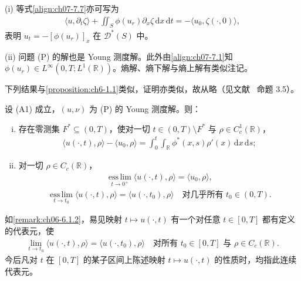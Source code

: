 \documentclass[../../main.tex]{subfiles}%
\begin{document}
\begin{remark}\label{remark:ch07-7.1.3}
(i) 等式\eqref{align:ch07-7.7}亦可写为
\begin{align*}
\langle u,\partial_t\zeta\rangle+\iint_S\phi(u_r)\partial_x\zeta\,\mathrm{d}x\,\mathrm{d}t=-\langle u_0,\zeta(\cdot,0)\rangle,
\end{align*}
表明 $u_t=-[\phi(u_r)]_x$ 在 $\mathcal{D}^*(S)$ 中。

(ii) 问题 (P) 的解也是 Young 测度解。此外由\eqref{align:ch07-7.1}知 $\phi(u_r)\in L^\infty(0,T;L^1(\mathbb{R}))$。熵解、熵下解与熵上解有类似注记。
\end{remark}

下列结果与\cref{proposition:ch6-1.1}类似，证明亦类似，故从略（见文献~\cite{ref17} 命题 3.5）。

\begin{proposition}\label{proposition:ch07-7.1.1}
设 (A1) 成立，$(u,\nu)$ 为 (P) 的 Young 测度解。则：
\begin{enumerate}[(i)]
\item 存在零测集 $F^*\subseteq(0,T)$，使对一切 $t\in(0,T)\setminus F^*$ 与 $\rho\in C^1_c(\mathbb{R})$，
\begin{align}
\langle u(\cdot,t),\rho\rangle-\langle u_0,\rho\rangle
=\int_0^t\int_{\mathbb{R}}\phi^*(x,s)\rho'(x)\,\mathrm{d}x\,\mathrm{d}s; \label{align:ch07-7.11}
\end{align}
\item 对一切 $\rho\in C_c(\mathbb{R})$，
\begin{align}
\operatorname*{ess\,lim}_{t\to0^+}\langle u(\cdot,t),\rho\rangle=\langle u_0,\rho\rangle, \label{align:ch07-7.12}
\end{align}
\begin{align}
\operatorname*{ess\,lim}_{t\to t_0}\langle u(\cdot,t),\rho\rangle=\langle u(\cdot,t_0),\rho\rangle
\quad\text{对几乎所有 }t_0\in(0,T). \label{align:ch07-7.13}
\end{align}
\end{enumerate}
\end{proposition}

\begin{remark}\label{remark:ch07-7.1.4}
如\cref{remark:ch06-6.1.2}，易见映射 $t\mapsto u(\cdot,t)$ 有一个对任意 $t\in[0,T]$ 都有定义的代表元，使
\begin{align}
\lim_{t\to t_0}\langle u(\cdot,t),\rho\rangle=\langle u(\cdot,t_0),\rho\rangle
\quad\text{对所有 }t_0\in[0,T]\text{ 与 }\rho\in C_c(\mathbb{R}). \label{align:ch07-7.14}
\end{align}
今后凡对 $t$ 在 $[0,T]$ 的某子区间上陈述映射 $t\mapsto u(\cdot,t)$ 的性质时，均指此连续代表元。
\end{remark}
\end{document}
